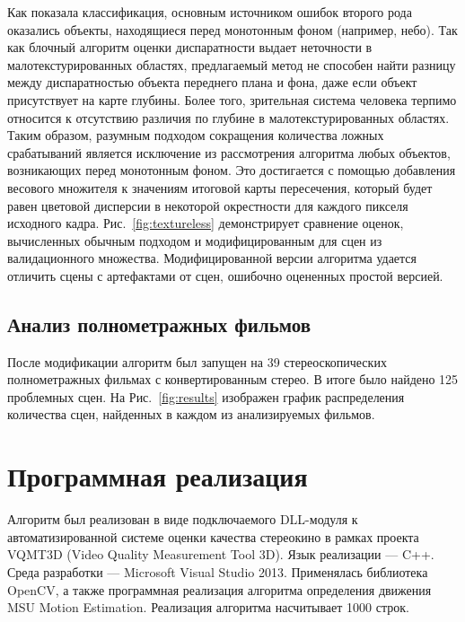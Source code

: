 \documentclass[14pt, a4paper]{extarticle}
\begin{document}


Как показала классификация, основным источником ошибок второго рода оказались
объекты, находящиеся перед монотонным фоном (например, небо). Так как блочный
алгоритм оценки диспаратности выдает неточности в малотекстурированных 
областях, предлагаемый метод не способен найти разницу между диспаратностью
объекта переднего плана и фона, даже если объект присутствует на карте глубины.
Более того, зрительная система человека терпимо относится к отсутствию различия
по глубине в малотекстурированных областях. Таким образом, разумным подходом
сокращения количества ложных срабатываний  является исключение из рассмотрения
алгоритма любых объектов, возникающих перед монотонным фоном. Это достигается
с помощью добавления весового множителя к значениям итоговой карты пересечения,
который будет равен цветовой дисперсии в некоторой окрестности для
каждого пикселя исходного кадра. Рис.~\ref{fig:textureless} демонстрирует
сравнение оценок, вычисленных обычным подходом и модифицированным 
для сцен из валидационного множества. Модифицированной версии алгоритма удается
отличить сцены с артефактами от сцен, ошибочно оцененных простой версией.

\subsection{Анализ полнометражных фильмов}



После модификации алгоритм был запущен на 39 стереоскопических полнометражных
фильмах с конвертированным стерео. В итоге было найдено 125 проблемных сцен. 
На Рис.~\ref{fig:results} изображен график распределения количества сцен, 
найденных в каждом из анализируемых фильмов.



\newpage
\newpage
\newpage
\clearpage
\section{Программная реализация}

Алгоритм был реализован в виде подключаемого DLL-модуля к автоматизированной 
системе оценки качества стереокино в рамках проекта VQMT3D 
(Video Quality Measurement Tool 3D). Язык реализации --- C++. Среда разработки --- 
Microsoft Visual Studio 2013. Применялась библиотека OpenCV, а также программная 
реализация алгоритма определения движения MSU Motion Estimation. 
Реализация алгоритма насчитывает 1000 строк. 
\end{document}
